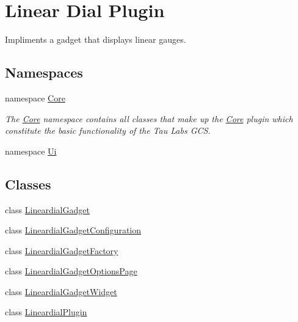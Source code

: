 \hypertarget{group___linear_dial_plugin}{\section{Linear Dial Plugin}
\label{group___linear_dial_plugin}
}


Impliments a gadget that displays linear gauges.  


\subsection*{Namespaces}
\begin{DoxyCompactItemize}
\item 
namespace \hyperlink{namespace_core}{Core}
\begin{DoxyCompactList}\small\item\em The \hyperlink{namespace_core}{Core} namespace contains all classes that make up the \hyperlink{namespace_core}{Core} plugin which constitute the basic functionality of the Tau Labs G\-C\-S. \end{DoxyCompactList}\item 
namespace \hyperlink{namespace_ui}{Ui}
\end{DoxyCompactItemize}
\subsection*{Classes}
\begin{DoxyCompactItemize}
\item 
class \hyperlink{class_lineardial_gadget}{Lineardial\-Gadget}
\item 
class \hyperlink{class_lineardial_gadget_configuration}{Lineardial\-Gadget\-Configuration}
\item 
class \hyperlink{class_lineardial_gadget_factory}{Lineardial\-Gadget\-Factory}
\item 
class \hyperlink{class_lineardial_gadget_options_page}{Lineardial\-Gadget\-Options\-Page}
\item 
class \hyperlink{class_lineardial_gadget_widget}{Lineardial\-Gadget\-Widget}
\item 
class \hyperlink{class_lineardial_plugin}{Lineardial\-Plugin}
\end{DoxyCompactItemize}
